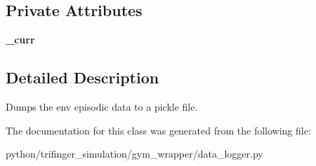 \subsection*{Private Attributes}
\begin{DoxyCompactItemize}
\item 
\mbox{\label{classtrifinger__simulation_1_1gym__wrapper_1_1data__logger_1_1DataLogger_a855bce5dc38c90b0c0cfc1a6c034c511}} 
{\bfseries \+\_\+curr}
\end{DoxyCompactItemize}


\subsection{Detailed Description}
Dumps the env episodic data to a pickle file. 

The documentation for this class was generated from the following file\+:\begin{DoxyCompactItemize}
\item 
python/trifinger\+\_\+simulation/gym\+\_\+wrapper/data\+\_\+logger.\+py\end{DoxyCompactItemize}
